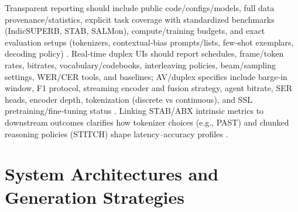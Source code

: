 Transparent reporting should include public code/configs/models, full data provenance/statistics, explicit task coverage with standardized benchmarks (IndicSUPERB, STAB, SALMon), compute/training budgets, and exact evaluation setups (tokenizers, contextual‑bias prompts/lists, few‑shot exemplars, decoding policy) \cite{vashishth2024stabspeechtokenizerassessmentbenchmark,entry2025indicsuperbspeechprocessinguniversalperf,maimon2025salmonsuiteacousticlanguagemodelevaluati,chen2023reducingbarriersselfsupervisedlearninghu,sun2023contextualbiasingnamedentitieslargelangu}. Real‑time duplex UIs should report schedules, frame/token rates, bitrates, vocabulary/codebooks, interleaving policies, beam/sampling settings, WER/CER tools, and baselines; AV/duplex specifics include barge‑in window, F1 protocol, streaming encoder and fusion strategy, agent bitrate, SER heads, encoder depth, tokenization (discrete vs continuous), and SSL pretraining/fine‑tuning status \cite{yang2024buildingtaiwanesemandarinspokenlanguagem,wang2023slmbridgethingapbetweenspeechtextfoundat,maimon2025salmonsuiteacousticlanguagemodelevaluati,entry2025indicsuperbspeechprocessinguniversalperf,li2025continuousspeechtokenizertext,hu2025salmduplexefficientdirectmodelingspeechl,chen2023reducingbarriersselfsupervisedlearninghu}. Linking STAB/ABX intrinsic metrics to downstream outcomes clarifies how tokenizer choices (e.g., PAST) and chunked reasoning policies (STITCH) shape latency–accuracy profiles \cite{har-tuv2025pastphoneticacousticspeechtokenizer,fily2024establishingdegreesclosenessbetweenaudio,vashishth2024stabspeechtokenizerassessmentbenchmark,entry2025indicsuperbspeechprocessinguniversalperf,chiang2025stitchsimultaneousthinkingtalkingchunked}.

















\section{System Architectures and Generation Strategies} \label{sec:System Architectures and Generation Strategies}

